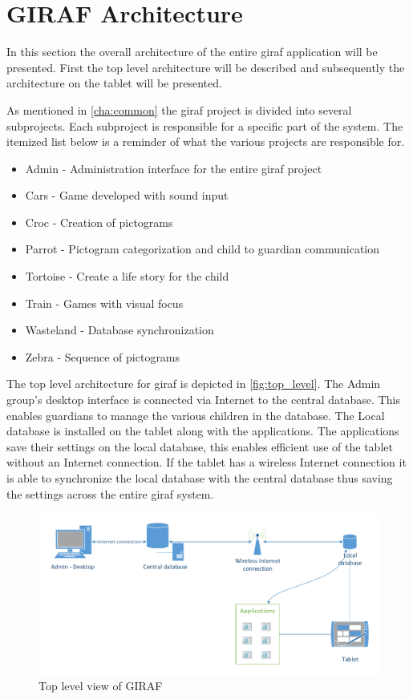 \section{GIRAF Architecture}
In this section the overall architecture of the entire \ac{giraf} application will be presented. First the top level architecture will be described and subsequently the architecture on the tablet will be presented.

As mentioned in \autoref{cha:common} the \ac{giraf} project is divided into several subprojects. Each subproject is responsible for a specific part of the system. The itemized list below is a reminder of what the various projects are responsible for.

\begin{itemize}
	\item Admin - Administration interface for the entire \ac{giraf} project
	\item Cars - Game developed with sound input
	\item Croc - Creation of pictograms
	\item Parrot - Pictogram categorization and child to guardian communication
	\item Tortoise - Create a life story for the child
	\item Train - Games with visual focus
	\item Wasteland - Database synchronization
	\item Zebra - Sequence of pictograms
\end{itemize}

The top level architecture for \ac{giraf} is depicted in \autoref{fig:top_level}. The Admin group's desktop interface is connected via Internet to the central database. This enables guardians to manage the various children in the database. The Local database is installed on the tablet along with the applications. The applications save their settings on the local database, this enables efficient use of the tablet without an Internet connection. If the tablet has a wireless Internet connection it is able to synchronize the local database with the central database thus saving the settings across the entire \ac{giraf} system. 

\begin{figure}[htpb]
\includegraphics[width=\textwidth]{img/top_level.pdf}
\caption{Top level view of GIRAF}
\label{fig:top_level}
\end{figure}

